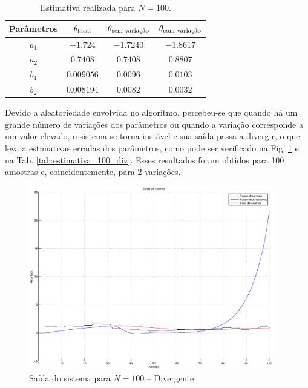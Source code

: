 \begin{table}
\centering
    \caption{Estimativa realizada para $N = 100$.}
    \label{tab:estimativa_100}
    \vspace{0.25cm}
    \begin{tabular}{|c|c|c|c|}
        \hline
        Parâmetros & 
        $\mathbf{\theta}_{\text{ideal}}$&
        $\mathbf{\theta}_{\text{sem variação}}$&
        $\mathbf{\theta}_{\text{com variação}}$\\
        \hline
        \hline
        $a_1$ & $-1.724$   & $-1.7240$ & $-1.8617$ \\
        \hline
        $a_2$ & $0.7408$   & $0.7408$  & $0.8807$ \\
        \hline
        $b_1$ & $0.009056$ & $0.0096$  & $0.0103$ \\
        \hline
        $b_2$ & $0.008194$ & $0.0082$  & $0.0032$ \\
        \hline
    \end{tabular}
\end{table}

Devido a aleatoriedade envolvida no algoritmo, percebeu-se que quando há um
grande número de variações dos parâmetros ou quando a variação corresponde a um
valor elevado, o sistema se torna instável e sua saída passa a divergir, o que
leva a estimativas erradas dos parâmetros, como pode ser verificado na Fig.
\ref{fig:saida_sist_100_div} e na Tab. \ref{tab:estimativa_100_div}. Esses
resultados foram obtidos para 100 amostras e, coincidentemente, para 2
variações.

\begin{figure}[htb]
\centering
    \includegraphics[width=0.95\textwidth]{imgs/questao2/saida_100_div}
    \caption{Saída do sistema para $N = 100$ -- Divergente.}
    \label{fig:saida_sist_100_div}
\end{figure}

